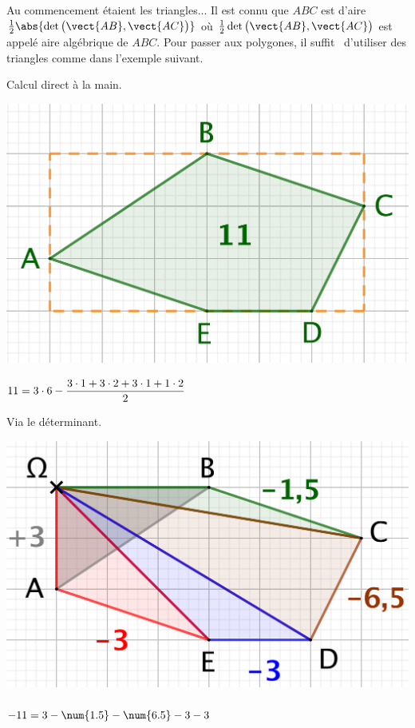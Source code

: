 Au commencement étaient les triangles... Il est connu que $ABC$ est d'aire $\frac12 \abs{ \det \big( \vect{AB} , \vect{AC} \big) }$ où $\frac12 \det \big( \vect{AB} , \vect{AC} \big)$ est appelé aire algébrique de $ABC$. Pour passer aux polygones, il \og suffit \fg\ d'utiliser des triangles comme dans l'exemple suivant.


\begin{multicols}{2}
	\small\itshape
    \begin{center}
		Calcul direct à la main.

		\smallskip

        \includegraphics[scale=.35]{content/polygon/alg-area/convex-1.png}

       	\smallskip

		$11 = 3 \cdot 6 - \dfrac{3 \cdot 1 + 3 \cdot 2 + 3 \cdot 1 + 1 \cdot 2}{2} \vphantom{\dfrac{2^M}2}$
    \end{center}

	\columnbreak

    \begin{center}
		Via le déterminant.

		\smallskip

        \includegraphics[scale=.35]{content/polygon/alg-area/convex-2.png}

       	\smallskip

		$- 11 = 3 - \num{1.5} - \num{6.5} - 3 - 3 \vphantom{\dfrac{2^M}2}$
    \end{center}
\end{multicols}


